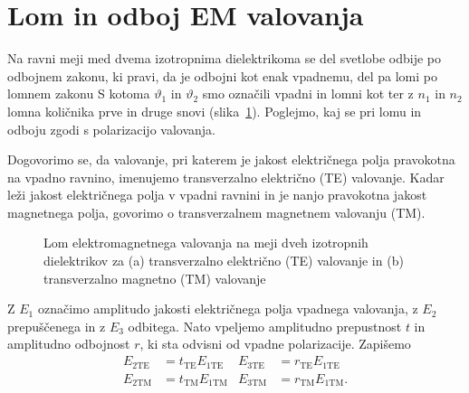 \section{Lom in odboj EM valovanja}
Na ravni meji med dvema izotropnima dielektrikoma se del svetlobe
odbije po odbojnem zakonu, ki pravi, da je odbojni kot enak vpadnemu, 
del pa lomi po lomnem zakonu 
S kotoma $\vartheta_{1}$ in $\vartheta_{2}$ smo označili vpadni in lomni
kot ter z $n_{1}$ in $n_{2}$ lomna količnika prve in druge snovi (slika~\ref{fig:Lom}).
Poglejmo, kaj se pri lomu in odboju zgodi s polarizacijo valovanja.

Dogovorimo se, da valovanje, pri katerem je jakost električnega polja pravokotna 
na vpadno ravnino, imenujemo transverzalno električno (TE) 
valovanje. Kadar leži jakost električnega polja v
vpadni ravnini in je nanjo pravokotna jakost magnetnega polja,
govorimo o transverzalnem magnetnem valovanju (TM).\\
\begin{figure}[h]
\centering {} 
  
\caption{Lom elektromagnetnega valovanja na meji dveh izotropnih dielektrikov za (a)
trans\-ver\-zal\-no električno (TE) valovanje in (b) trans\-ver\-zal\-no magnetno (TM) valovanje}
\label{fig:Lom}
\end{figure}

Z $E_1$ označimo amplitudo jakosti električnega polja vpadnega valovanja, 
z $E_2$ prepuščenega in z $E_3$ odbitega.
Nato vpeljemo amplitudno prepustnost $t$ in amplitudno odbojnost $r$, 
ki sta odvisni od vpadne polarizacije. Zapišemo
\begin{align}
E_{2\mathrm{TE}} & =t_{\mathrm{TE}}E_{1\mathrm{TE}} & E_{3\mathrm{TE}} &=r_{\mathrm{TE}}E_{1\mathrm{TE}}\\
E_{2\mathrm{TM}} & =t_{\mathrm{TM}}E_{1\mathrm{TM}} & E_{3\mathrm{TM}}&=r_{\mathrm{TM}}E_{1\mathrm{TM}}.
\end{align}

